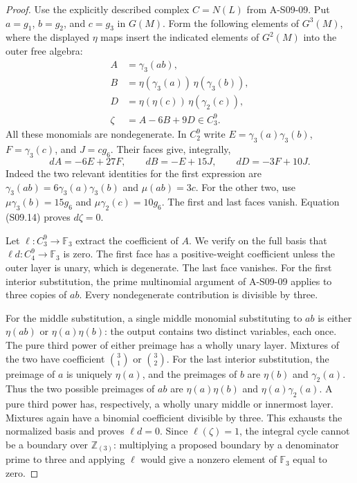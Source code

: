 \begin{proof}
Use the explicitly described complex $C=N(L)$ from A-S09-09.
Put $a=g_1$, $b=g_2$, and $c=g_3$ in $G(M)$.  Form the following
elements of $G^3(M)$, where the displayed $\eta$ maps insert
the indicated elements of $G^2(M)$ into the outer free algebra:
\[
 \begin{split}
 A&=\gamma_3(ab),\\
 B&=\eta(\gamma_3(a))\,\eta(\gamma_3(b)),\\
 D&=\eta(\eta(c))\,\eta(\gamma_2(c)),\\
 \zeta&=A-6B+9D\in C_3^9.
 \end{split}
\]
All these monomials are nondegenerate.  In $C_2^9$ write
$E=\gamma_3(a)\gamma_3(b)$, $F=\gamma_3(c)$,
and $J=cg_6$.  Their faces give, integrally,
\[
 dA=-6E+27F,\qquad
 dB=-E+15J,\qquad
 dD=-3F+10J.
 \tag{S09.14}
\]
Indeed the two relevant identities for the first expression are
$\gamma_3(ab)=6\gamma_3(a)\gamma_3(b)$ and
$\mu(ab)=3c$.  For the other two, use
$\mu\gamma_3(b)=15g_6$ and
$\mu\gamma_2(c)=10g_6$.  The first and last faces vanish.
Equation (S09.14) proves $d\zeta=0$.

Let $\ell:C_3^9\to\mathbb F_3$ extract the coefficient of $A$.
We verify on the full basis that $\ell d:C_4^9\to\mathbb F_3$
is zero.  The first face has a positive-weight coefficient unless
the outer layer is unary, which is degenerate.  The last face
vanishes.  For the first interior substitution, the prime
multinomial argument of A-S09-09 applies to three copies of $ab$.
Every nondegenerate contribution is divisible by three.

For the middle substitution, a single middle monomial substituting
to $ab$ is either $\eta(ab)$ or $\eta(a)\eta(b)$: the output
contains two distinct variables, each once.  The pure third
power of either preimage has a wholly unary layer.  Mixtures of
the two have coefficient $\binom31$ or $\binom32$.
For the last interior substitution, the preimage of $a$ is uniquely
$\eta(a)$, and the preimages of $b$ are $\eta(b)$ and
$\gamma_2(a)$.  Thus the two possible preimages of $ab$ are
$\eta(a)\eta(b)$ and $\eta(a)\gamma_2(a)$.  A pure third
power has, respectively, a wholly unary middle or innermost
layer.  Mixtures again have a binomial coefficient divisible by
three.  This exhausts the normalized basis and proves $\ell d=0$.
Since $\ell(\zeta)=1$, the integral cycle cannot be a boundary
over $\mathbb Z_{(3)}$: multiplying a proposed boundary by a
denominator prime to three and applying $\ell$ would give a
nonzero element of $\mathbb F_3$ equal to zero.


\end{proof}
